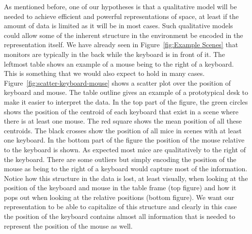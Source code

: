 \documentclass[letterpaper, 10 pt, conference]{ieeeconf}  %
\begin{document}
As mentioned before, one of our hypotheses is that a qualitative model will be needed to achieve efficient and powerful representations of 
space, at least if the amount of data is limited as it will be in most cases. Such qualitative models could allow some of the inherent 
structure in the environment be encoded in the representation itself. We have already seen in Figure~\ref{fig:Example Scenes} that monitors 
are typically in the back while the keyboard is in front of it. The leftmost table shows an example of a mouse being to the right of a 
keyboard. This is something that we would also expect to hold in many cases. Figure~\ref{fig:scatter-keyboard-mouse} shows a scatter plot 
over the position of keyboard and mouse. The table outline gives an example of a prototypical desk to make it easier to interpret the data. 
In the top part of the figure, the green circles shows the position of the centroid of each 
keyboard that exist in a scene where there is at least one mouse. The red square shows the mean position of all these centroids. The black 
crosses show the position of all mice in scenes with at least one keyboard. In the bottom part of the figure the position of the mouse 
relative to the keyboard is shown. As expected most mice are qualitatively to the right of the keyboard. There are some outliers but simply 
encoding the position of the mouse as being to the right of a keyboard would capture most of the information. Notice how this structure in the data is lost, at least visually, when looking at the position of the keyboard and mouse in the table frame (top figure) and how it pops out when looking at the relative positions (bottom figure). We want our representation to be able to capitalize of this structure and clearly in this case the position of the keyboard contains almost all information that is needed to represent the position of the mouse as well.
\end{document}
